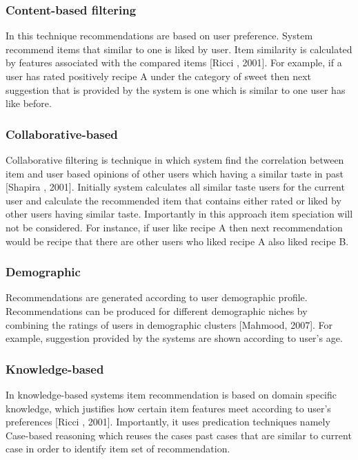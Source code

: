 \subsubsection{Content-based filtering}

In this technique recommendations are based on user preference. System recommend items that similar to one is liked by user. Item similarity is calculated by features associated with the compared items [Ricci , 2001]. For example, if a user has rated positively recipe A under the category of sweet then next suggestion that is provided by the system is one which is similar to one user has like before.

\subsubsection{Collaborative-based}

Collaborative filtering is technique in which system find the correlation between item and user based opinions of other users which having a similar taste in past [Shapira , 2001]. Initially system calculates all similar taste users for the current user and calculate the recommended item that contains either rated or liked by other users having similar taste. Importantly in this approach item speciation will not be considered. For instance, if user like recipe A then next recommendation would be recipe that there are other users who liked recipe A also liked recipe B.

\subsubsection{Demographic}

Recommendations are generated according to user demographic profile. Recommendations can be produced for different demographic niches by combining the ratings of users in demographic clusters [Mahmood, 2007]. For example, suggestion provided by the systems are shown according to user’s age. 

\subsubsection{Knowledge-based}

In knowledge-based systems item recommendation is based on domain specific knowledge, which justifies how certain item features meet according to user’s preferences [Ricci , 2001]. Importantly, it uses predication techniques namely Case-based reasoning which reuses the cases past cases that are similar to current case in order to identify item set of recommendation.

